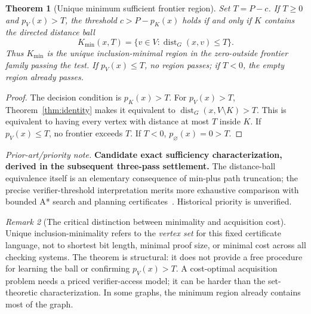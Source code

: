 \documentclass[11pt,letterpaper]{article}
\newtheorem{theorem}{Theorem}[section]
\theoremstyle{definition}
\theoremstyle{remark}
\newtheorem{remark}[theorem]{Remark}
\newcommand{\dist}{\operatorname{dist}}
\newcommand{\novel}[1]{\par\begingroup\small\textit{Prior-art/priority note.} #1\par\endgroup}
\begin{document}
\begin{theorem}[Unique minimum sufficient frontier region]\label{thm:ball}
Set \(T=P-c\). If \(T\ge0\) and \(p_V(x)>T\), the threshold \(c>P-p_K(x)\) holds \emph{if and only if} \(K\) contains the directed distance ball
\begin{equation}\label{eq:ball}
\boxed{\qquad K_{\min}(x,T)=\{v\in V:\dist_G(x,v)\le T\}.\qquad}
\end{equation}
Thus \(K_{\min}\) is the unique inclusion-minimal region in the zero-outside frontier family passing the test. If \(p_V(x)\le T\), no region passes; if \(T<0\), the empty region already passes.
\end{theorem}
\begin{proof}
The decision condition is \(p_K(x)>T\). For \(p_V(x)>T\), Theorem~\ref{thm:identity} makes it equivalent to \(\dist_G(x,V\setminus K)>T\). This is equivalent to having every vertex with distance at most \(T\) inside \(K\). If \(p_V(x)\le T\), no frontier exceeds \(T\). If \(T<0\), \(p_{\varnothing}(x)=0>T\).
\end{proof}
\novel{\textbf{Candidate exact sufficiency characterization, derived in the subsequent three-pass settlement.} The distance-ball equivalence itself is an elementary consequence of min-plus path truncation; the precise verifier-threshold interpretation merits more exhaustive comparison with bounded A* search and planning certificates~\cite{Settlement,Hart1968,Mugdan2023}. Historical priority is unverified.}

\begin{remark}[The critical distinction between minimality and acquisition cost]
Unique inclusion-minimality refers to the \emph{vertex set} for this fixed certificate language, not to shortest bit length, minimal proof size, or minimal cost across all checking systems. The theorem is structural: it does not provide a free procedure for learning the ball or confirming \(p_V(x)>T\). A cost-optimal acquisition problem needs a priced verifier-access model; it can be harder than the set-theoretic characterization. In some graphs, the minimum region already contains most of the graph.
\end{remark}
\end{document}
